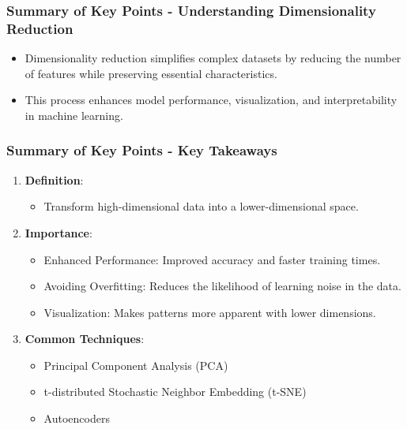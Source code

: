 \documentclass[aspectratio=169]{beamer}
\begin{document}
\begin{frame}[fragile]
    \frametitle{Summary of Key Points - Understanding Dimensionality Reduction}
    \begin{itemize}
        \item Dimensionality reduction simplifies complex datasets by reducing the number of features while preserving essential characteristics.
        \item This process enhances model performance, visualization, and interpretability in machine learning.
    \end{itemize}
\end{frame}

\begin{frame}[fragile]
    \frametitle{Summary of Key Points - Key Takeaways}
    \begin{enumerate}
        \item \textbf{Definition}:
        \begin{itemize}
            \item Transform high-dimensional data into a lower-dimensional space.
        \end{itemize}
        
        \item \textbf{Importance}:
        \begin{itemize}
            \item Enhanced Performance: Improved accuracy and faster training times.
            \item Avoiding Overfitting: Reduces the likelihood of learning noise in the data.
            \item Visualization: Makes patterns more apparent with lower dimensions.
        \end{itemize}

        \item \textbf{Common Techniques}:
        \begin{itemize}
            \item Principal Component Analysis (PCA)
            \item t-distributed Stochastic Neighbor Embedding (t-SNE)
            \item Autoencoders
        \end{itemize}
    \end{enumerate}
\end{frame}
\end{document}
